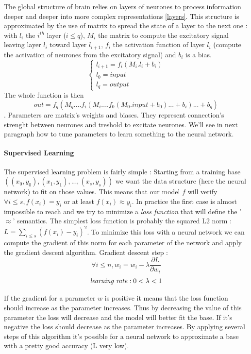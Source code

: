 \documentclass[11pt]{article}
\begin{document}
The global structure of brain relies on layers of neurones to process information deeper and deeper into more complex representations \ref{layers}. This structure is approximated by the use of matrix to spread the state of a layer to the next one : \\

with $l_{i}$ the $i^{th}$ layer ($i\le q$), $M_i$ the matrix to compute the excitatory signal leaving layer $l_{i}$ toward layer $l_{i+1}$, $f_i$ the activation function of layer $l_i$ (compute the activation of neurones from the excitatory signal) and $b_i$ is a bias.
\begin{equation*}
\begin{cases}
l_{i+1} = f_{i}(M_{i}. l_i + b_{i}) \\
l_0 = input \\
l_{q} = output
\end{cases}
\end{equation*}
The whole function is then $$out = f_q(M_q. ... f_i(M_i. ... f_0(M_0.input+b_0) ... + b_i) ... +b_q)$$. Parameters are matrix's weights and biases. They represent connection's strenght between neurones and treshold to excitate neurones. We'll see in next paragraph how to tune parameters to learn something to the neural network.

\paragraph{Supervised Learning}
The supervised learning problem is fairly simple : Starting from a training base $((x_0,y_0),(x_1,y_1), ... , (x_s,y_s))$ we want the data structure (here the neural network) to fit on those values. This means that our model $f$ will verify $\forall i\le s, f(x_i) = y_i$ or at least $f(x_i) \approx y_i$. In practice the first case is almost impossible to reach and we try to minimize a \emph{loss function} that will define the '$\approx$' semantics. The simplest loss function is probably the squared L2 norm : $L = \sum_{i\le s}(f(x_i)-y_i)^2$. 
To minimize this loss with a neural network we can compute the gradient of this norm for each parameter of the network and apply the gradient descent algorithm.
Gradient descent step :
$$\forall i\le n, w_i = w_i - \lambda  \frac{\partial L}{\partial w_i}$$
$$ \mbox{\emph{learning rate}} : 0<\lambda<1$$

If the gradient for a parameter $w$ is positive it means that the loss function should increase as the parameter increases. Thus by decreasing the value of this parameter the loss will decrease and the model will better fit the base. If it's negative the loss should decrease as the parameter increases.
By applying several steps of this algorithm it's possible for a neural network to approximate a base with a pretty good accuracy (L very low).
\end{document}
